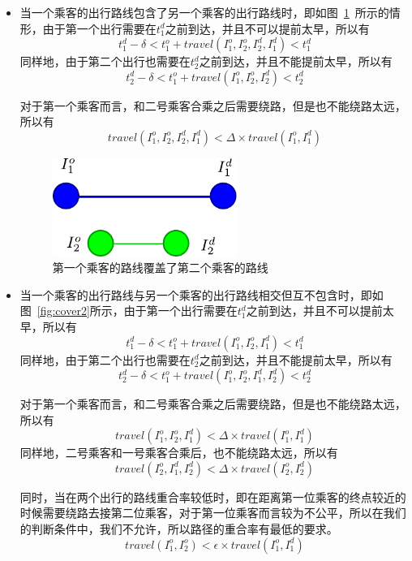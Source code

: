 \begin{itemize}
\item 当一个乘客的出行路线包含了另一个乘客的出行路线时，即如图~\ref{fig:cover1}~所示的情形，由于第一个出行需要在$t_1^d$之前到达，并且不可以提前太早，所以有
\begin{equation}
  t_1^d - \delta < t_1^o + travel(I_1^o,I_2^o,I_2^d,I_1^d) < t_1^d
\end{equation}
同样地，由于第二个出行也需要在$t_2^d$之前到达，并且不能提前太早，所以有
\begin{equation}
  t_2^d - \delta < t_1^o + travel(I_1^o,I_2^o,I_2^d) < t_2^d
\end{equation}
\par
对于第一个乘客而言，和二号乘客合乘之后需要绕路，但是也不能绕路太远，所以有
\begin{equation}
travel(I_1^o,I_2^o,I_2^d,I_1^d) < \Delta \times travel(I_1^o,I_1^d)
\end{equation}

      \begin{figure}
      \centering
      \includegraphics[width=6cm]{./figures/img/coverage1.pdf}
      \caption{第一个乘客的路线覆盖了第二个乘客的路线}
      \label{fig:cover1}
      \end{figure}

\item 当一个乘客的出行路线与另一个乘客的出行路线相交但互不包含时，即如图~\ref{fig:cover2}所示，由于第一个出行需要在$t_1^d$之前到达，并且不可以提前太早，所以有
\begin{equation}
  t_1^d - \delta < t_1^o + travel(I_1^o,I_2^o,I_1^d) < t_1^d
\end{equation}
同样地，由于第二个出行也需要在$t_2^d$之前到达，并且不能提前太早，所以有
\begin{equation}
  t_2^d - \delta < t_1^o + travel(I_1^o,I_2^o,I_1^d,I_2^d) < t_2^d
\end{equation}
\par
对于第一个乘客而言，和二号乘客合乘之后需要绕路，但是也不能绕路太远，所以有
\begin{equation}
travel(I_1^o,I_2^o,I_1^d) < \Delta \times travel(I_1^o,I_1^d)
\end{equation}
同样地，二号乘客和一号乘客合乘后，也不能绕路太远，所以有
\begin{equation}
travel(I_2^o,I_1^d,I_2^d) < \Delta \times travel(I_2^o,I_2^d)
\end{equation}
\par
同时，当在两个出行的路线重合率较低时，即在距离第一位乘客的终点较近的时候需要绕路去接第二位乘客，对于第一位乘客而言较为不公平，所以在我们的判断条件中，我们不允许，所以路径的重合率有最低的要求。
\begin{equation}
travel(I_1^o,I_2^o) < \epsilon \times travel(I_1^o, I_1^d)
\end{equation}


\end{itemize}
